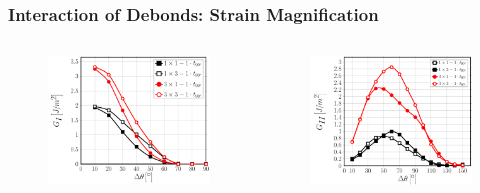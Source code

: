 \documentclass[first,firstsupp,lastsupp,last,hyperref,table]{ETHclass}
\begin{document}
\begin{frame}
\frametitle{\vspace{0.2cm}\small Interaction of Debonds: Strain Magnification}
\vspace{-.75cm}
\centering
\begin{columns}[c]
\centering
\begin{column}{0.5\textwidth}
\centering
\begin{figure}
\centering
\includegraphics[width=\columnwidth]{nxk-1-vf60-GI-strainmagni3.pdf}
\end{figure}
\end{column}
\begin{column}{0.5\textwidth}
\centering
\begin{figure}
\centering
\includegraphics[width=\columnwidth]{nxk-1-vf60-GII-strainmagni3.pdf}

\end{figure}
\end{column}
\end{columns}
\end{frame}
\end{document}
